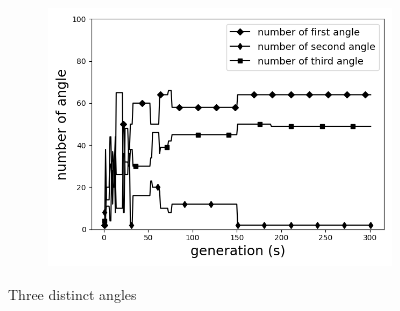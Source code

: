 \begin{figure}[!t]
		\begin{subfigure}[b]{0.8\linewidth}
			\includegraphics[width=\linewidth]{2020-11-10-pre-image/three_distinct_angle_number_of_angle.png}
		\end{subfigure}
	\caption{Three distinct angles}
	\label{fig:three_angles}
\end{figure}



